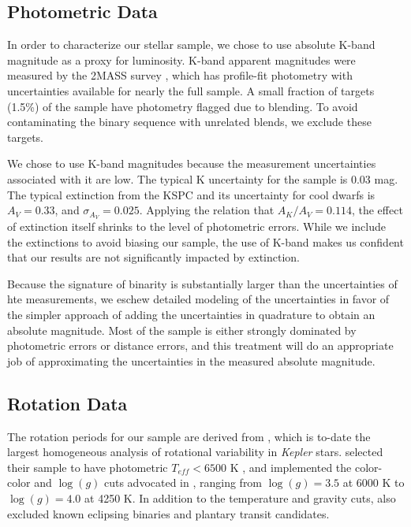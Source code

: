 \documentclass[manuscript]{aastex6}
\newcommand{\Kepler}{\mbox{\textit{Kepler}}}
\newcommand{\Teff}{\ensuremath{T_{eff}}}
\newcommand{\logg}{\ensuremath{\log(g)}}
\begin{document}
\subsection{Photometric Data}

In order to characterize our stellar sample, we chose to use absolute K-band
magnitude as a proxy for luminosity. K-band apparent magnitudes were measured
by the 2MASS survey \citep{Skrutskie06}, which has profile-fit photometry with 
uncertainties available for nearly the full sample. A small fraction of 
targets (1.5\%) of the \citet{McQuillan14} sample have photometry flagged due
to blending. To avoid contaminating the binary sequence with unrelated blends,
we exclude these targets.

We chose to use K-band magnitudes because the measurement uncertainties
associated with it are low. The typical K uncertainty for the
\citet{McQuillan14} sample is 0.03 mag. The typical extinction from the KSPC 
and its uncertainty for cool dwarfs is \(A_V = 0.33\), and \(\sigma_{A_V}=0.025\).
Applying the \citet{Cardelli89} relation that \(A_K/A_V = 0.114\), the effect
of extinction itself shrinks to the level of photometric errors. While we
include the extinctions to avoid biasing our sample, the use of K-band makes us
confident that our results are not significantly impacted by extinction.

Because the signature of binarity is substantially larger than the
uncertainties of hte measurements, we eschew detailed modeling of the
uncertainties \citep{Luri18} in favor of the simpler approach of adding the 
uncertainties in quadrature to obtain an absolute magnitude. Most of the 
sample is either strongly dominated by photometric errors or distance errors, 
and this treatment will do an appropriate job of approximating the 
uncertainties in the measured absolute magnitude.

\subsection{Rotation Data}

The rotation periods for our sample are derived from \citet{McQuillan14}, 
which is to-date the largest homogeneous analysis of rotational variability in
\Kepler{} stars. \citet{McQuillan14} selected their sample to have photometric
\(\Teff < 6500\) K \citep{Brown11,Dressing13}, and implemented the color-color
and \logg{} cuts advocated in \citet{Ciardi11}, ranging from \(\logg = 
3.5\) at 6000 K to \(\logg = 4.0\) at 4250 K. 
In addition to the temperature and gravity cuts, \citet{McQuillan14} also 
excluded known eclipsing binaries and plantary transit candidates. 
\end{document}
